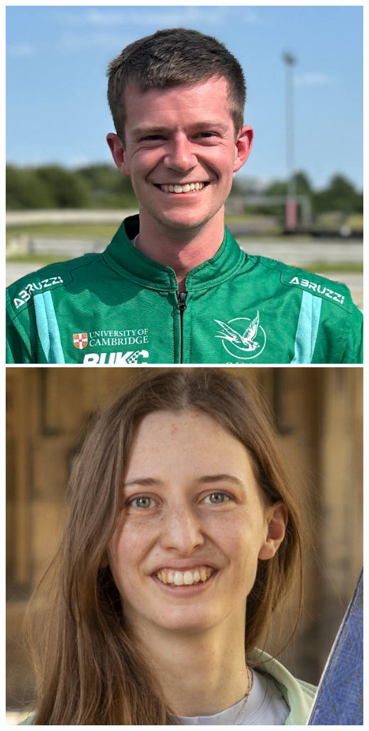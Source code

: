 \documentclass[aspectratio=169]{beamer}
\begin{document}
\begin{frame}
{        \includegraphics[width=0.06\textheight]{people/adam_ormondroyd.jpg}%
        \includegraphics[width=0.06\textheight]{people/charlotte_priestley.jpg}%
}
\end{frame}
\end{document}
